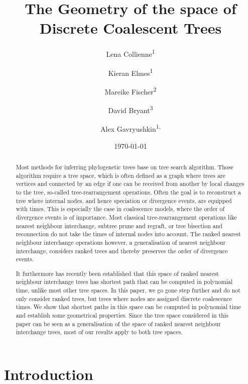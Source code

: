 \documentclass[11pt]{amsart}
\title[Geometry of ranked tree spaces]{The Geometry of the space of Discrete Coalescent Trees}
\date{\today}
\author{Lena Collienne\textsuperscript{1}}
\author{Kieran Elmes\textsuperscript{1}}
\author{Mareike Fischer\textsuperscript{2}}
\author{David Bryant\textsuperscript{3}}
\author{Alex Gavryushkin\textsuperscript{1, \Letter}}
\begin{document}
\begin{abstract}
	Most methods for inferring phylogenetic trees base on tree search algorithm.
	Those algorithm require a tree space, which is often defined as a graph where trees are vertices and connected by an edge if one can be received from another by local changes to the tree, so-called tree-rearrangement operations.
	Often the goal is to reconstruct a tree where internal nodes, and hence speciation or divergence events, are equipped with times.
	This is especially the case in coalescence models, where the order of divergence events is of importance.
	Most classical tree-rearrangement operations like nearest neighbour interchange, subtree prune and regraft, or tree bisection and reconnection do not take the times of internal nodes into account.
	The ranked nearest neighbour interchange operations however, a generalisation of nearest neighbour interchange, considers ranked trees and thereby preserves the order of divergence events.

	It furthermore has recently been established that this space of ranked nearest neighbour interchange trees has shortest path that can be computed in polynomial time, unlike most other tree spaces.
	In this paper, we go gone step further and do not only consider ranked trees, but trees where nodes are assigned discrete coalescence times.
	We show that shortest paths in this space can be computed in polynomial time and establish some geometrical properties.
	Since the tree space considered in this paper can be seen as a generalisation of the space of ranked nearest neighbour interchange trees, most of our results apply to both tree spaces.
\end{abstract}

\maketitle


\section{Introduction}
\end{document}
